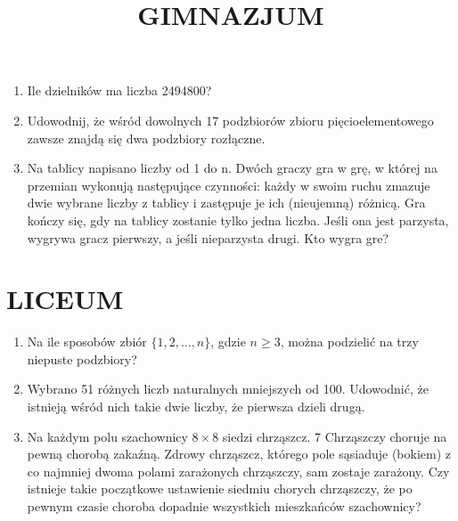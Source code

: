 \documentclass[10pt]{article}
\title{GIMNAZJUM }
\author{}
\date{}
\begin{document}
\maketitle
\begin{enumerate}
  \item Ile dzielników ma liczba 2494800?
  \item Udowodnij, że wśród dowolnych 17 podzbiorów zbioru pięcioelementowego zawsze znajdą się dwa podzbiory rozłączne.
  \item Na tablicy napisano liczby od 1 do n. Dwóch graczy gra w grę, w której na przemian wykonują następujące czynności: każdy w swoim ruchu zmazuje dwie wybrane liczby z tablicy i zastępuje je ich (nieujemną) różnicą. Gra kończy się, gdy na tablicy zostanie tylko jedna liczba. Jeśli ona jest parzysta, wygrywa gracz pierwszy, a jeśli nieparzysta drugi. Kto wygra gre?
\end{enumerate}

\section*{LICEUM}
\begin{enumerate}
  \item Na ile sposobów zbiór \(\{1,2, \ldots, n\}\), gdzie \(n \geq 3\), można podzielić na trzy niepuste podzbiory?
  \item Wybrano 51 różnych liczb naturalnych mniejszych od 100. Udowodnić, że istnieją wśród nich takie dwie liczby, że pierwsza dzieli drugą.
  \item Na każdym polu szachownicy \(8 \times 8\) siedzi chrząszcz. 7 Chrząszczy choruje na pewną chorobą zakaźną. Zdrowy chrząszcz, którego pole sąsiaduje (bokiem) z co najmniej dwoma polami zarażonych chrząszczy, sam zostaje zarażony. Czy istnieje takie początkowe ustawienie siedmiu chorych chrząszczy, że po pewnym czasie choroba dopadnie wszystkich mieszkańców szachownicy?
\end{enumerate}
\end{document}
